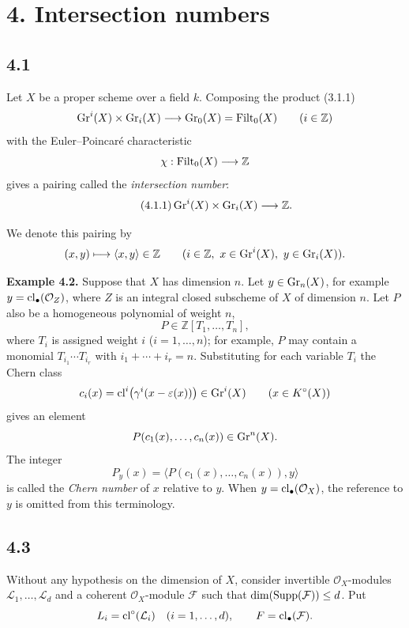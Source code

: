 \section*{4. Intersection numbers}

\subsection*{4.1}
Let $X$ be a proper scheme over a field $k$. Composing the product (3.1.1)
\[
\operatorname{Gr}^i(X)\times\operatorname{Gr}_i(X)\longrightarrow\operatorname{Gr}_0(X)=\operatorname{Filt}_0(X)
\qquad(i\in\mathbb Z)
\]
with the Euler--Poincar\'e characteristic
\[
\chi:\operatorname{Filt}_0(X)\longrightarrow\mathbb Z
\]
gives a pairing called the \emph{intersection number}:
\begin{equation}\tag{4.1.1}
\operatorname{Gr}^i(X)\times\operatorname{Gr}_i(X)\longrightarrow\mathbb Z.
\end{equation}

We denote this pairing by
\[
(x,y)\longmapsto\langle x,y\rangle\in\mathbb Z
\qquad(i\in\mathbb Z,\ x\in\operatorname{Gr}^i(X),\ y\in\operatorname{Gr}_i(X)).
\]

\textbf{Example 4.2.}
Suppose that $X$ has dimension $n$. Let $y\in\operatorname{Gr}_n(X)$, for example
$y=\operatorname{cl}_\bullet(\mathcal O_Z)$, where $Z$ is an integral closed subscheme of
$X$ of dimension $n$. Let $P$ also be a homogeneous polynomial of weight $n$,
\[
P\in\mathbb Z[T_1,\ldots,T_n],
\]
where $T_i$ is assigned weight $i$ ($i=1,\ldots,n$); for example, $P$ may
contain a monomial $T_{i_1}\cdots T_{i_r}$ with
$i_1+\cdots+i_r=n$. Substituting for each variable $T_i$ the Chern class
\[
c_i(x)=\operatorname{cl}^i\bigl(\gamma^i(x-\varepsilon(x))\bigr)\in\operatorname{Gr}^i(X)
\qquad(x\in K^\circ(X))
\]
gives an element
\[
P(c_1(x),\ldots,c_n(x))\in\operatorname{Gr}^n(X).
\]
The integer
\[
P_y(x)=\bigl\langle P(c_1(x),\ldots,c_n(x)),y\bigr\rangle
\]
is called the \emph{Chern number} of $x$ relative to $y$. When
$y=\operatorname{cl}_\bullet(\mathcal O_X)$, the reference to $y$ is omitted from this
terminology.

\subsection*{4.3}
Without any hypothesis on the dimension of $X$, consider invertible
$\mathcal O_X$-modules $\mathcal L_1,\ldots,\mathcal L_d$ and a coherent
$\mathcal O_X$-module $\mathcal F$ such that
$\dim(\operatorname{Supp}(\mathcal F))\leq d$. Put
\[
L_i=\operatorname{cl}^\circ(\mathcal L_i)\quad(i=1,\ldots,d),
\qquad F=\operatorname{cl}_\bullet(\mathcal F).
\]

